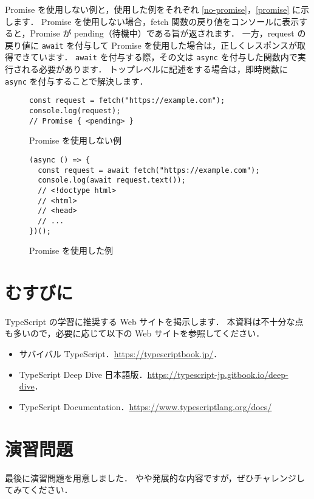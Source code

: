 \documentclass[a4j, 11pt]{jarticle}
\begin{document}
Promise を使用しない例と，使用した例をそれぞれ \autoref{no-promise}，\autoref{promise} に示します．
Promise を使用しない場合，fetch 関数の戻り値をコンソールに表示すると，Promise が pending（待機中）である旨が返されます．
一方，request の戻り値に \verb|await| を付与して Promise を使用した場合は，正しくレスポンスが取得できています．
\verb|await| を付与する際，その文は \verb|async| を付与した関数内で実行される必要があります．
トップレベルに記述をする場合は，即時関数に \verb|async| を付与することで解決します．

\begin{figure}[H]
\caption{Promise を使用しない例}
\label{no-promise}
\begin{lstlisting}
const request = fetch("https://example.com");
console.log(request);
// Promise { <pending> }
\end{lstlisting}
\end{figure}

\begin{figure}[H]
\caption{Promise を使用した例}
\label{promise}
\begin{lstlisting}
(async () => {
  const request = await fetch("https://example.com");
  console.log(await request.text());
  // <!doctype html>
  // <html>
  // <head>
  // ...
})();  
\end{lstlisting}
\end{figure}

\section{むすびに}

TypeScript の学習に推奨する Web サイトを掲示します．
本資料は不十分な点も多いので，必要に応じて以下の Web サイトを参照してください．

\begin{itemize}
  \setlength{\itemsep}{0mm}
  \item サバイバル TypeScript．\url{https://typescriptbook.jp/}．
  \item TypeScript Deep Dive 日本語版．\url{https://typescript-jp.gitbook.io/deep-dive}．
  \item TypeScript Documentation．\url{https://www.typescriptlang.org/docs/}
\end{itemize}

\section{演習問題}

最後に演習問題を用意しました．
やや発展的な内容ですが，ぜひチャレンジしてみてください．
\end{document}
